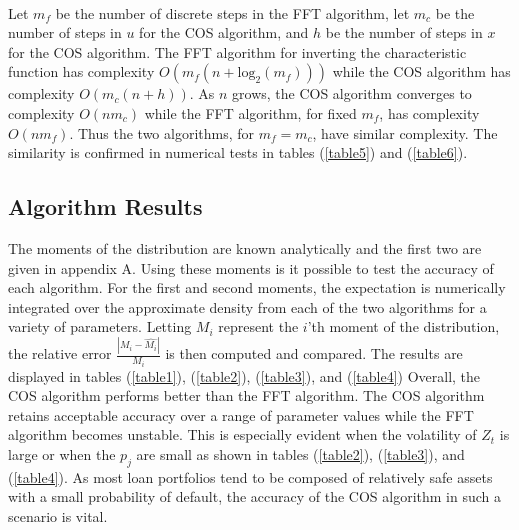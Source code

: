 \documentclass[12pt]{article}
\theoremstyle{definition}
\begin{document}
\\
 Let \(m_{f}\) be the number of discrete steps in the FFT algorithm, let \(m_{c}\) be the number of steps in \(u\) for the COS algorithm, and \(h\) be the number of steps in \(x\) for the COS algorithm. The FFT algorithm for inverting the characteristic function has complexity \(O(m_{f}(n+\text{log}_2 (m_{f})))\) while the COS algorithm has complexity \(O(m_{c} (n +h))\).   As \(n\) grows, the COS algorithm converges to complexity \(O(nm_c)\) while the FFT algorithm, for fixed \(m_f\), has complexity \(O(n m_f )\). Thus the two algorithms, for \(m_f=m_c\), have similar complexity.  The similarity is confirmed in numerical tests in tables (\ref{table5}) and (\ref{table6}).


\subsection{Algorithm Results}
The moments of the distribution are known analytically and the first two are given in appendix A.  Using these moments is it possible to test the accuracy of each algorithm.  For the first and second moments, the expectation is numerically integrated over the approximate density from each of the two algorithms for a variety of parameters.  Letting \(M_i\) represent the \(i\)'th moment of the distribution, the relative error \(\frac{| M_i-\hat{M_i}|}{M_i}\) is then computed and compared.  The results are displayed in tables (\ref{table1}), (\ref{table2}), (\ref{table3}), and (\ref{table4}) Overall, the COS algorithm performs better than the FFT algorithm.  The COS algorithm retains acceptable accuracy over a range of  parameter values while the FFT algorithm becomes unstable.  This is especially evident when the volatility of \(Z_t\) is large or when the \(p_j\) are small as shown in tables (\ref{table2}), (\ref{table3}), and (\ref{table4}).  As most loan portfolios tend to be composed of relatively safe assets with a small probability of default, the accuracy of the COS algorithm in such a scenario is vital.  
\\
\\

\\
\\

 \\
\\

\\
\\

\\
\\
\end{document}
